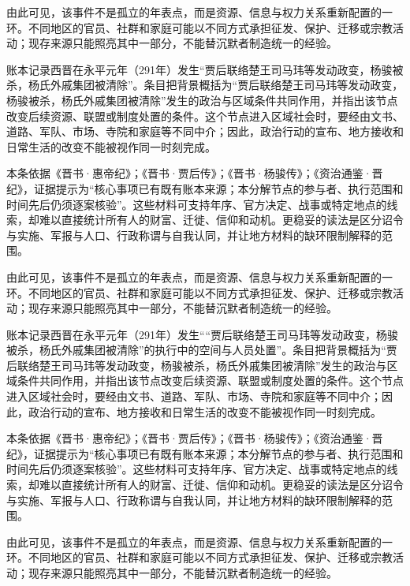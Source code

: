 由此可见，该事件不是孤立的年表点，而是资源、信息与权力关系重新配置的一环。不同地区的官员、社群和家庭可能以不同方式承担征发、保护、迁移或宗教活动；现存来源只能照亮其中一部分，不能替沉默者制造统一的经验。

账本记录西晋在永平元年（291年）发生“贾后联络楚王司马玮等发动政变，杨骏被杀，杨氏外戚集团被清除”。条目把背景概括为“贾后联络楚王司马玮等发动政变，杨骏被杀，杨氏外戚集团被清除”发生的政治与区域条件共同作用，并指出该节点改变后续资源、联盟或制度处置的条件。这个节点进入区域社会时，要经由文书、道路、军队、市场、寺院和家庭等不同中介；因此，政治行动的宣布、地方接收和日常生活的改变不能被视作同一时刻完成。

本条依据《晋书·惠帝纪》；《晋书·贾后传》；《晋书·杨骏传》；《资治通鉴·晋纪》，证据提示为“核心事项已有既有账本来源；本分解节点的参与者、执行范围和时间先后仍须逐案核验”。这些材料可支持年序、官方决定、战事或特定地点的线索，却难以直接统计所有人的财富、迁徙、信仰和动机。更稳妥的读法是区分诏令与实施、军报与人口、行政称谓与自我认同，并让地方材料的缺环限制解释的范围。

由此可见，该事件不是孤立的年表点，而是资源、信息与权力关系重新配置的一环。不同地区的官员、社群和家庭可能以不同方式承担征发、保护、迁移或宗教活动；现存来源只能照亮其中一部分，不能替沉默者制造统一的经验。

账本记录西晋在永平元年（291年）发生““贾后联络楚王司马玮等发动政变，杨骏被杀，杨氏外戚集团被清除”的执行中的空间与人员处置”。条目把背景概括为“贾后联络楚王司马玮等发动政变，杨骏被杀，杨氏外戚集团被清除”发生的政治与区域条件共同作用，并指出该节点改变后续资源、联盟或制度处置的条件。这个节点进入区域社会时，要经由文书、道路、军队、市场、寺院和家庭等不同中介；因此，政治行动的宣布、地方接收和日常生活的改变不能被视作同一时刻完成。

本条依据《晋书·惠帝纪》；《晋书·贾后传》；《晋书·杨骏传》；《资治通鉴·晋纪》，证据提示为“核心事项已有既有账本来源；本分解节点的参与者、执行范围和时间先后仍须逐案核验”。这些材料可支持年序、官方决定、战事或特定地点的线索，却难以直接统计所有人的财富、迁徙、信仰和动机。更稳妥的读法是区分诏令与实施、军报与人口、行政称谓与自我认同，并让地方材料的缺环限制解释的范围。

由此可见，该事件不是孤立的年表点，而是资源、信息与权力关系重新配置的一环。不同地区的官员、社群和家庭可能以不同方式承担征发、保护、迁移或宗教活动；现存来源只能照亮其中一部分，不能替沉默者制造统一的经验。

